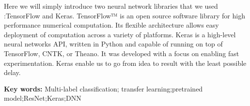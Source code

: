 {Here we will simply introduce two neural network libraries that we used :TensorFlow and Keras.
TensorFlow™ is an open source software library for high performance numerical computation. 
Its flexible architecture allows easy deployment of computation across a variety of platforms.
Keras is a high-level neural networks API, written in Python 
and capable of running on top of TensorFlow, CNTK, or Theano. It was developed with a focus on enabling 
fast experimentation. Keras enable us to go from idea to result with the least possible delay.

\par}

\vspace{-0.2\baselineskip}
\noindent\textbf{Key words: } Multi-label classification; transfer learning;pretrained model;ResNet;Keras;DNN 

\clearpage
